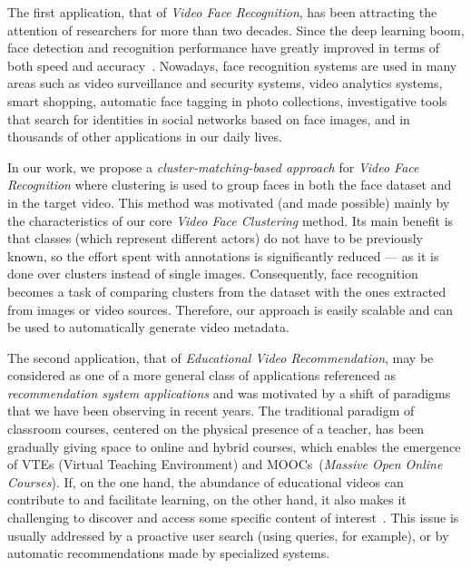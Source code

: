 The first application, that of \emph{Video Face Recognition}, has been attracting the attention of researchers for more than two decades. Since the deep learning boom, face detection and recognition performance have greatly improved in terms of both speed and accuracy~\cite{masi2018deep}. Nowadays, face recognition systems are used in many areas such as video surveillance and security systems, video analytics systems, smart shopping, automatic face tagging in photo collections, investigative tools that search for identities in social networks based on face images, and in thousands of other applications in our daily lives.

In our work, we propose a \textit{cluster-matching-based approach} for \emph{Video Face Recognition} where clustering is used to group faces in both the face dataset and in the target video. This method was motivated (and made possible) mainly by the characteristics of our core \emph{Video Face Clustering} method. Its main benefit is that classes (which represent different actors) do not have to be previously known, so the effort spent with annotations is significantly reduced --- as it is done over clusters instead of single images. Consequently, face recognition becomes a task of comparing clusters from the dataset with the ones extracted from images or video sources. Therefore, our approach is easily scalable and can be used to automatically generate video metadata.

The second application, that of \emph{Educational Video Recommendation}, may be considered as one of a more general class of applications referenced as \textit{recommendation system applications} and was motivated by a shift of paradigms that we have been observing in recent years. The traditional paradigm of classroom courses, centered on the physical presence of a teacher, has been gradually giving space to online and hybrid courses, which enables the emergence of VTEs (Virtual Teaching Environment) and MOOCs~(\textit{Massive Open Online Courses}).
If, on the one hand, the abundance of educational videos can contribute to and facilitate learning, on the other hand, it also makes it challenging to discover and access some specific content of interest~\cite{dias2017approach}.
This issue is usually addressed by a proactive user search (using queries, for example), or by automatic recommendations made by specialized systems.


